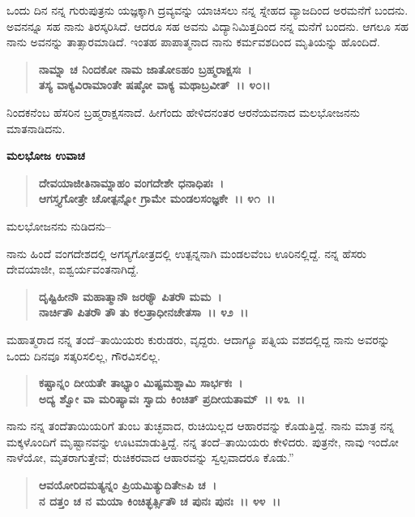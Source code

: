ಒಂದು ದಿನ ನನ್ನ ಗುರುಪುತ್ರನು ಯಜ್ಞಕ್ಕಾಗಿ ದ್ರವ್ಯವನ್ನು ಯಾಚಿಸಲು ನನ್ನ ಸ್ನೇಹದ ವ್ಯಾಜದಿಂದ ಅರಮನೆಗೆ ಬಂದನು. ಅವನನ್ನೂ ಸಹ ನಾನು ತಿರಸ್ಕರಿಸಿದೆ. ಆದರೂ ಸಹ ಅವನು ವಿದ್ಯಾನಿಮಿತ್ತದಿಂದ ನನ್ನ ಮನೆಗೆ ಬಂದನು. ಆಗಲೂ ಸಹ ನಾನು ಅವನನ್ನು ತಾತ್ಸಾರಮಾಡಿದೆ. ಇಂತಹ ಪಾಪಾತ್ಮನಾದ ನಾನು ಕರ್ಮವಶದಿಂದ ಮೃತಿಯನ್ನು ಹೊಂದಿದೆ.

\begin{verse}
\textbf{ನಾಮ್ನಾ ಚ ನಿಂದಕೋ ನಾಮ ಜಾತೋಽಹಂ ಬ್ರಹ್ಮರಾಕ್ಷಸಃ~।}\\\textbf{ತಸ್ಯ ವಾಕ್ಯವಿರಾಮಾಂತೇ ಷಷ್ಠೋ ವಾಕ್ಯ ಮಥಾಬ್ರವೀತ್~।। ೪೦।।}
\end{verse}

ನಿಂದಕನೆಂಬ ಹೆಸರಿನ ಬ್ರಹ್ಮರಾಕ್ಷಸನಾದೆ. ಹೀಗೆಂದು ಹೇಳಿದನಂತರ ಆರನೆಯವನಾದ ಮಲಭೋಜನನು ಮಾತನಾಡಿದನು.

\begin{flushleft}
\textbf{ಮಲಭೋಜ ಉವಾಚ}
\end{flushleft}

\begin{verse}
\textbf{ದೇವಯಾಜೀತಿನಾಮ್ನಾಹಂ ವಂಗದೇಶೇ ಧನಾಧಿಪಃ~।}\\\textbf{ಆಗಸ್ತ್ಯಗೋತ್ರೇ ಚೋತ್ಪನ್ನೋ ಗ್ರಾಮೇ ಮಂಡಲಸಂಜ್ಞಕೇ~।। ೪೧~।।}
\end{verse}

\begin{flushleft}
ಮಲಭೋಜನನು ನುಡಿದನು–
\end{flushleft}

ನಾನು ಹಿಂದೆ ವಂಗದೇಶದಲ್ಲಿ ಅಗಸ್ಯಗೋತ್ರದಲ್ಲಿ ಉತ್ಪನ್ನನಾಗಿ ಮಂಡಲವೆಂಬ ಊರಿ\-ನಲ್ಲಿದ್ದೆ. ನನ್ನ ಹೆಸರು ದೇವಯಾಜೀ, ಐಶ್ವರ್ಯವಂತನಾಗಿದ್ದೆ.

\begin{verse}
\textbf{ದೃಷ್ಟಿಹೀನೌ ಮಹಾತ್ಮಾನೌ ಜರಠ್ಯೌ ಪಿತರೌ ಮಮ~।}\\\textbf{ನಾರ್ಚಿತೌ ಪಿತರೌ‌ ತೌ ತು ಕಲತ್ರಾಧೀನಚೇತಸಾ~।। ೪೨~।।}
\end{verse}

ಮಹಾತ್ಮರಾದ ನನ್ನ ತಂದೆ–ತಾಯಿಯರು ಕುರುಡರು, ವೃದ್ದರು. ಆದಾಗ್ಯೂ ಪತ್ನಿಯ ವಶದಲ್ಲಿದ್ದ ನಾನು ಅವರನ್ನು ಒಂದು ದಿನವೂ ಸತ್ಕರಿಸಲಿಲ್ಲ, ಗೌರವಿಸಲಿಲ್ಲ.

\begin{verse}
\textbf{ಕಷ್ಟಾನ್ನಂ ದೀಯತೇ ತಾಭ್ಯಾಂ ಮಿಷ್ಟಮಶ್ನಾಮಿ ಸಾರ್ಭಕಃ~।}\\\textbf{ಅದ್ಯ ಶ್ವೋ ವಾ ಮರಿಷ್ಯಾವಃ ಸ್ವಾದು ಕಿಂಚಿತ್ ಪ್ರದೀಯತಾಮ್~।। ೪೩~।।}
\end{verse}

ನಾನು ನನ್ನ ತಂದೆತಾಯಿಯರಿಗೆ ತುಂಬ ತುಚ್ಛವಾದ, ರುಚಿಯಿಲ್ಲದ ಆಹಾರವನ್ನು ಕೊಡುತ್ತಿದ್ದೆ. ನಾನು ಮಾತ್ರ ನನ್ನ ಮಕ್ಕಳೊಂದಿಗೆ ಮೃಷ್ಟಾನವನ್ನು ಊಟಮಾಡುತ್ತಿದ್ದೆ. ನನ್ನ ತಂದೆ–ತಾಯಿಯರು ಕೇಳಿದರು. ಪುತ್ರನೇ, ನಾವು ಇಂದೋ ನಾಳೆಯೋ, ಮೃತರಾಗುತ್ತೇವೆ; ರುಚಿಕರವಾದ ಆಹಾರವನ್ನು ಸ್ವಲ್ಪವಾದರೂ ಕೊಡು.”

\begin{verse}
\textbf{ಆವಯೋರಿದಮತ್ಯನ್ನಂ ಪ್ರಿಯಮಿತ್ಯುದಿತೇsಪಿ ಚ~।}\\\textbf{ನ ದತ್ತಂ ಚ ನ ಮಯಾ ಕಿಂಚಿತ್ಭರ್ತ್ಸಿತೌ ಚ ಪುನಃ ಪುನಃ~।। ೪೪~।।}
\end{verse}

